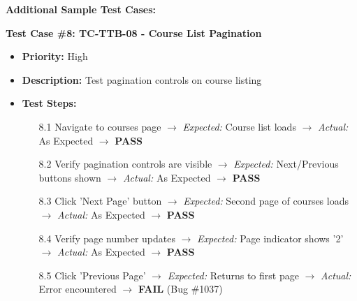 \textbf{Additional Sample Test Cases:}

\textbf{Test Case \#8: TC-TTB-08 - Course List Pagination}
\begin{itemize}[leftmargin=*]
    \item \textbf{Priority:} High
    \item \textbf{Description:} Test pagination controls on course listing
    \item \textbf{Test Steps:}
    \begin{enumerate}[leftmargin=*]
        \item[8.1] Navigate to courses page $\rightarrow$ \textit{Expected:} Course list loads $\rightarrow$ \textit{Actual:} As Expected $\rightarrow$ \textbf{PASS}
        \item[8.2] Verify pagination controls are visible $\rightarrow$ \textit{Expected:} Next/Previous buttons shown $\rightarrow$ \textit{Actual:} As Expected $\rightarrow$ \textbf{PASS}
        \item[8.3] Click 'Next Page' button $\rightarrow$ \textit{Expected:} Second page of courses loads $\rightarrow$ \textit{Actual:} As Expected $\rightarrow$ \textbf{PASS}
        \item[8.4] Verify page number updates $\rightarrow$ \textit{Expected:} Page indicator shows '2' $\rightarrow$ \textit{Actual:} As Expected $\rightarrow$ \textbf{PASS}
        \item[8.5] Click 'Previous Page' $\rightarrow$ \textit{Expected:} Returns to first page $\rightarrow$ \textit{Actual:} Error encountered $\rightarrow$ \textbf{FAIL} (Bug \#1037)
    \end{enumerate}
\end{itemize}

